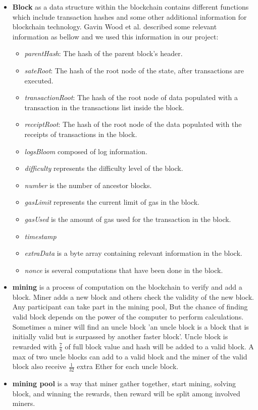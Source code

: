 \begin{itemize}
    \item \textbf{Block} as a data structure within the blockchain   contains different functions which include transaction hashes and some other additional information for blockchain technology. Gavin Wood et al. \cite{Gavin} described some relevant information as bellow and we used this information in our project: \\
    \begin{itemize}
        \item \textit{parentHash}: The hash of the parent block’s header.
        \item \textit{sateRoot}: The hash of the root node of the state, after transactions are executed.
        \item \textit{transactionRoot}: The hash of the root node of data populated with a transaction in the transactions list inside the block.
        \item \textit{receiptRoot}: The hash of the root node of the data populated with the receipts of transactions in the block.
        \item \textit{logsBloom} composed of log information.
        \item \textit{difficulty} represents the difficulty level of the block.
        \item \textit{number} is the number of ancestor blocks.
        \item \textit{gasLimit} represents the current limit of gas in the block.
        \item \textit{gasUsed} is the amount of gas used for the transaction in the block.
        \item \textit{timestamp}
        \item \textit{extraData} is a byte array containing relevant information in the block.
        \item \textit{nonce} is several computations that have been done in the block.
    \end{itemize}
    \item \textbf{mining} is a process of computation on the blockchain to verify and add a block. Miner adds a new block and others check the validity of the new block. Any participant can take part in the mining pool, But the chance of finding valid block depends on the power of the computer to perform calculations. Sometimes a miner will find an uncle block 'an uncle block is a block that is initially valid but is surpassed by another faster block'. Uncle block is rewarded with $\frac{7}{8}$ of full block value and hash will be added to a valid block. A max of two uncle blocks can add to a valid block and the miner of the valid block also receive $\frac{1}{32}$ extra Ether for each uncle block\cite{Egbertsen}.
    \item \textbf{mining pool} is a way that miner gather together, start mining, solving block, and winning the rewards, then reward will be split among involved miners\cite{Egbertsen}.
\end{itemize}
